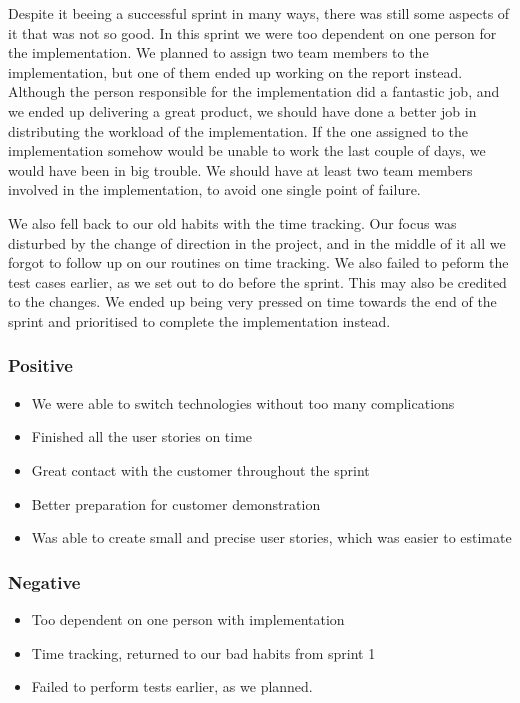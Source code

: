 Despite it beeing a successful sprint in many ways, there was still some aspects of it that was not so good. In this sprint we were too dependent on one person for the implementation. We planned to assign two team members to the implementation, but one of them ended up working on the report instead. Although the person responsible for the implementation did a fantastic job, and we ended up delivering a great product, we should have done a better job in distributing the workload of the implementation. If the one assigned to the implementation somehow would be unable to work the last couple of days, we would have been in big trouble. We should have at least two team members involved in the implementation, to avoid one single point of failure.


We also fell back to our old habits with the time tracking. Our focus was disturbed by the change of direction in the project, and in the middle of it all we forgot to follow up on our routines on time tracking. We also failed to peform the test cases earlier, as we set out to do before the sprint. This may also be credited to the changes. We ended up being very pressed on time towards the end of the sprint and prioritised to complete the implementation instead.

\subsubsection{Positive}

\begin{itemize}
\item We were able to switch technologies without too many complications
\item Finished all the user stories on time
\item Great contact with the customer throughout the sprint
\item Better preparation for customer demonstration
\item Was able to create small and precise user stories, which was easier to estimate
\end{itemize}

\subsubsection{Negative}

\begin{itemize}
\item Too dependent on one person with implementation
\item Time tracking, returned to our bad habits from sprint 1
\item Failed to perform tests earlier, as we planned.
\end{itemize}

